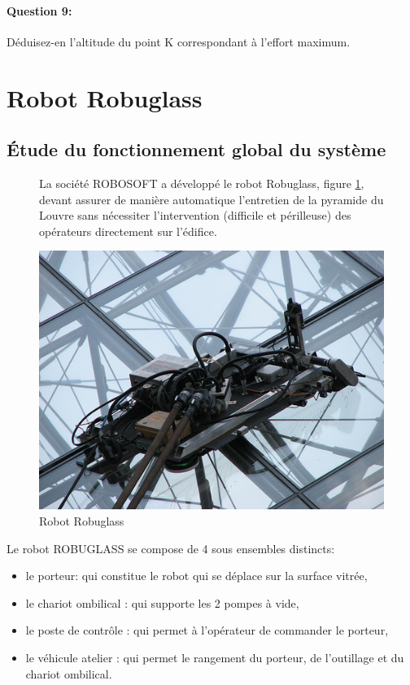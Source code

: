 \paragraph{Question 9:} Déduisez-en l'altitude du point K correspondant à l'effort maximum.

\newpage

\section{Robot Robuglass}

\subsection{Étude du fonctionnement global du système}

\begin{figure}[!h]
 \begin{minipage}{0.45\linewidth}
La société ROBOSOFT a développé le robot Robuglass, figure \ref{robuglass}, devant assurer de manière automatique l'entretien de la pyramide du Louvre sans nécessiter l'intervention (difficile et périlleuse) des opérateurs directement sur l'édifice.
 \end{minipage}
 \hfill
 \begin{minipage}{0.45\linewidth}
 \centering\includegraphics[width=0.9\linewidth]{img/robuglass.jpg}
 \end{minipage}
 \caption{Robot Robuglass}
 \label{robuglass}
\end{figure}


Le robot ROBUGLASS se compose de 4 sous ensembles distincts: 
\begin{itemize}
 \item le porteur: qui constitue le robot qui se déplace sur la surface vitrée,
 \item le chariot ombilical : qui supporte les 2 pompes à vide,
 \item le poste de contrôle : qui permet à l'opérateur de commander le porteur,
 \item le véhicule atelier : qui permet le rangement du porteur, de l'outillage et du chariot 
ombilical.
\end{itemize}

